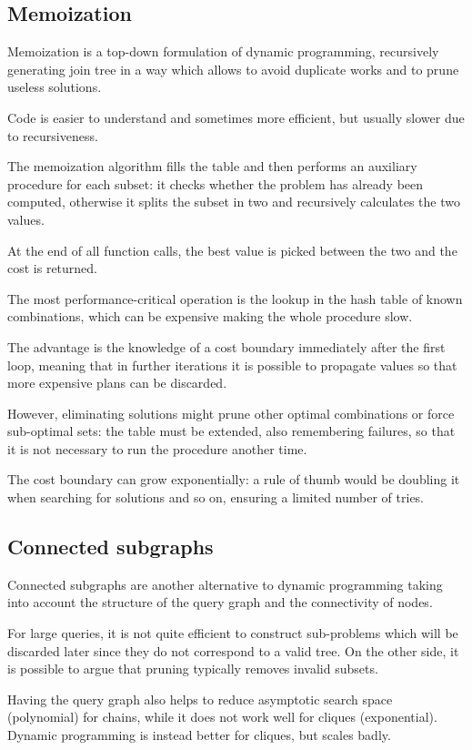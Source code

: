 \subsection{Memoization}
Memoization is a top-down formulation of dynamic programming, recursively generating join tree in a way which allows to avoid duplicate works and to prune useless solutions.

Code is easier to understand and sometimes more efficient, but usually slower due to recursiveness.

The memoization algorithm fills the table and then performs an auxiliary procedure for each subset: it checks whether the problem has already been computed, otherwise it splits the subset in two and recursively calculates the two values.

At the end of all function calls, the best value is picked between the two and the cost is returned. 

The most performance-critical operation is the lookup in the hash table of known combinations, which can be expensive making the whole procedure slow.

The advantage is the knowledge of a cost boundary immediately after the first loop, meaning that in further iterations it is possible to propagate values so that more expensive plans can be discarded.

However, eliminating solutions might prune other optimal combinations or force sub-optimal sets: the table must be extended, also remembering failures, so that it is not necessary to run the procedure another time.

The cost boundary can grow exponentially: a rule of thumb would be doubling it when searching for solutions and so on, ensuring a limited number of tries. 

\subsection{Connected subgraphs}
Connected subgraphs are another alternative to dynamic programming taking into account the structure of the query graph and the connectivity of nodes.

For large queries, it is not quite efficient to construct sub-problems which will be discarded later since they do not correspond to a valid tree. On the other side, it is possible to argue that pruning typically removes invalid subsets.

Having the query graph also helps to reduce asymptotic search space (polynomial) for chains, while it does not work well for cliques (exponential). Dynamic programming is instead better for cliques, but scales badly.

